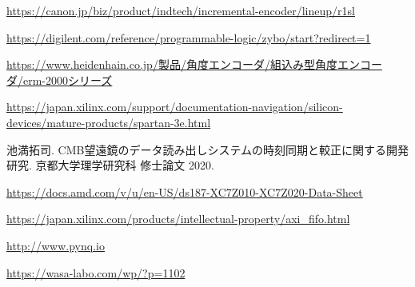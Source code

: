 \begin{thebibliography}{99}


\href{https://canon.jp/biz/product/indtech/incremental-encoder/lineup/r1sl}{https://canon.jp/biz/product/indtech/incremental-encoder/lineup/r1sl}

\href{https://digilent.com/reference/programmable-logic/zybo/start?redirect=1}{https://digilent.com/reference/programmable-logic/zybo/start?redirect=1}

\href{https://www.heidenhain.co.jp/製品/角度エンコーダ/組込み型角度エンコーダ/erm-2000シリーズ}{https://www.heidenhain.co.jp/製品/角度エンコーダ/組込み型角度エンコーダ/erm-2000シリーズ}

\href{https://japan.xilinx.com/support/documentation-navigation/silicon-devices/mature-products/spartan-3e.html}{
https://japan.xilinx.com/support/documentation-navigation/silicon-devices/mature-products/spartan-3e.html}

池満拓司. CMB望遠鏡のデータ読み出しシステムの時刻同期と較正に関する開発研究. 京都大学理学研究科 修士論文 2020.

\href{https://docs.amd.com/v/u/en-US/ds187-XC7Z010-XC7Z020-Data-Sheet}{https://docs.amd.com/v/u/en-US/ds187-XC7Z010-XC7Z020-Data-Sheet}

\href{https://japan.xilinx.com/products/intellectual-property/axi\_fifo.html}{https://japan.xilinx.com/products/intellectual-property/axi\_fifo.html}

\href{http://www.pynq.io}{http://www.pynq.io}

\href{https://wasa-labo.com/wp/?p=1102}{https://wasa-labo.com/wp/?p=1102}



\end{thebibliography}
